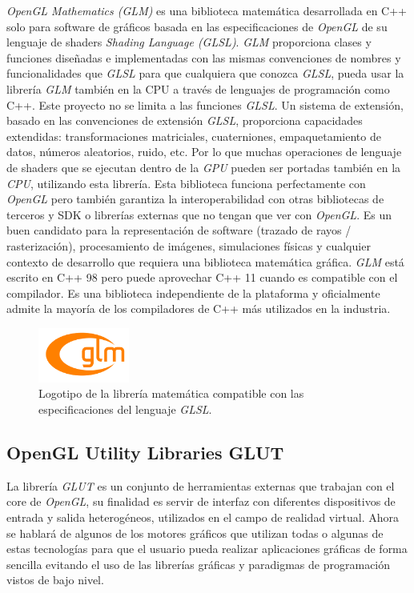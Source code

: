 \documentclass[a4paper]{book}
\begin{document}
\textit{OpenGL Mathematics (GLM)} es una biblioteca matemática desarrollada en C++ solo para software
de gráficos basada en las especificaciones de \textit{OpenGL} de su lenguaje de shaders \textit{Shading Language (GLSL)}.
\textit{GLM} proporciona clases y funciones diseñadas e implementadas con las mismas convenciones de nombres
y funcionalidades que \textit{GLSL} para que cualquiera que conozca \textit{GLSL}, pueda usar la librería \textit{GLM} también
en la CPU a través de lenguajes de programación como C++. Este proyecto no se limita a las funciones \textit{GLSL}.
Un sistema de extensión, basado en las convenciones de extensión \textit{GLSL}, proporciona capacidades extendidas:
transformaciones matriciales, cuaterniones, empaquetamiento de datos, números aleatorios, ruido, etc. Por lo que muchas
operaciones de lenguaje de shaders que se ejecutan dentro de la \textit{GPU} pueden ser portadas también en la \textit{CPU},
utilizando esta librería. Esta biblioteca funciona perfectamente con \textit{OpenGL} pero también garantiza la interoperabilidad con otras
bibliotecas de terceros y SDK o librerías externas que no tengan que ver con \textit{OpenGL}. Es un buen candidato
para la representación de software (trazado de rayos / rasterización), procesamiento de imágenes,
simulaciones físicas y cualquier contexto de desarrollo que requiera una biblioteca matemática gráfica. \textit{GLM}
está escrito en C++ 98 pero puede aprovechar C++ 11 cuando es compatible con el compilador. Es una
biblioteca independiente de la plataforma y oficialmente admite la mayoría de los compiladores de C++
más utilizados en la industria. \cite{glm:_manual}

\begin{figure}[H]
    \centering
    \includegraphics[width=3cm, keepaspectratio]{img/logo_glm.png}
    \caption{Logotipo de la librería matemática compatible con las especificaciones del lenguaje \textit{GLSL}.}
    \label{logo_glm}
\end{figure}

\subsection{OpenGL Utility Libraries GLUT}
\label{subsec:GLUT}

La librería \textit{GLUT} es un conjunto de herramientas externas que trabajan con el core de \textit{OpenGL},
su finalidad es servir de interfaz con diferentes dispositivos de entrada y salida heterogéneos,
utilizados en el campo de realidad virtual. Ahora se hablará de algunos de los motores gráficos que utilizan
todas o algunas de estas tecnologías para que el usuario pueda realizar aplicaciones gráficas de forma sencilla evitando
el uso de las librerías gráficas y paradigmas de programación vistos de bajo nivel. \cite{glut:docs}
\end{document}
